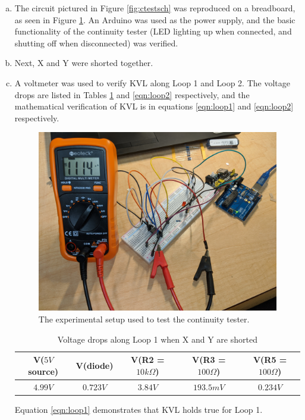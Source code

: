 \documentclass[12pt]{article}
\begin{document}
\begin{enumerate}[a)]
    \item The circuit pictured in Figure \ref{fig:ctestsch} was reproduced on a breadboard,
        as seen in Figure \ref{fig:sec4setup}. An Arduino was used as the power supply, and 
        the basic functionality of the continuity tester (LED lighting up when connected, and 
        shutting off when disconnected) was verified.

    \item Next, X and Y were shorted together.
    \item A voltmeter was used to verify KVL along Loop 1 and Loop 2. The voltage drops are listed
        in Tables \ref{tbl:loop1} and \ref{eqn:loop2} respectively, and the mathematical verification 
        of KVL is in equations \ref{eqn:loop1} and \ref{eqn:loop2} respectively.

        \begin{figure}[H]
            \centering
            \includegraphics[width=0.4\linewidth]{setup.jpg}
            \caption{The experimental setup used to test the continuity tester.}
            \label{fig:sec4setup}
        \end{figure}

        \begin{table}[ht]
            \caption{Voltage drops along Loop 1 when X and Y are shorted}
            \label{tbl:loop1}
            \centering
            \begin{tabular}{| c | c | c | c | c |}
                \hline
                V($5V$ source) & V(diode) & V(R2 = $10k\Omega$) & V(R3 = $100\Omega$) & V(R5 = $100\Omega$) \\
                \hline
                $4.99V$ & $0.723V$ & $3.84V$ & $193.5mV$ & $0.234V$ \\
                \hline 
            \end{tabular}
        \end{table}

        Equation \ref{eqn:loop1} demonstrates that KVL holds true for Loop 1.


\end{enumerate}
\end{document}

